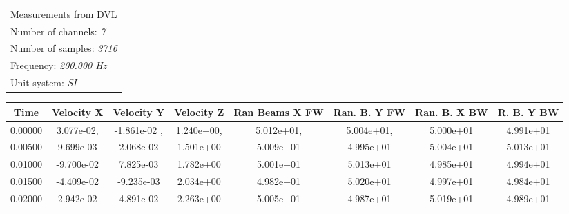 \documentclass[]{article}
\begin{document}
	\begin{table}[H]
		\begin{flushleft}
			\begin{tabular}{l}
				\toprule 
				\footnotesize Measurements from DVL \\
				\footnotesize Number of channels: \textit{7} \\
				\footnotesize Number of samples: \textit{3716} \\
				\footnotesize Frequency: \textit{200.000 Hz} \\
				\footnotesize Unit system: \textit{SI} \\
			\end{tabular}
			
		\end{flushleft}
		\begin{center}
			\begin{tabular}{cccccccc}
				\toprule
				\footnotesize Time & \footnotesize Velocity X &	\footnotesize Velocity Y &	\footnotesize Velocity Z &	\footnotesize Ran Beams X FW &	 \footnotesize Ran. B. Y FW &	\footnotesize Ran. B. X  BW  &	\footnotesize R. B. Y  BW \\
				\midrule
				\footnotesize 0.00000	& \footnotesize 3.077e-02, &	\footnotesize -1.861e-02 ,&	\footnotesize 1.240e+00,&	\footnotesize 5.012e+01,& \footnotesize 5.004e+01, &	\footnotesize 5.000e+01	& \footnotesize 4.991e+01 \\
				
				\footnotesize 0.00500 & \footnotesize 9.699e-03 & \footnotesize 2.068e-02& \footnotesize 1.501e+00 & \footnotesize 5.009e+01 & \footnotesize 4.995e+01 & \footnotesize 5.004e+01 & \footnotesize 5.013e+01 \\
				
				\footnotesize 0.01000 & \footnotesize -9.700e-02 & \footnotesize 7.825e-03 & \footnotesize 1.782e+00 & \footnotesize 5.001e+01 & \footnotesize 5.013e+01 & \footnotesize 4.985e+01 & \footnotesize 4.994e+01 \\
				
				\footnotesize 0.01500 & \footnotesize -4.409e-02 & \footnotesize -9.235e-03 & \footnotesize 2.034e+00 & \footnotesize 4.982e+01 & \footnotesize 5.020e+01 & \footnotesize 4.997e+01 & \footnotesize 4.984e+01 \\
				
				\footnotesize 0.02000 & \footnotesize 2.942e-02 & \footnotesize 4.891e-02 & \footnotesize 2.263e+00 & \footnotesize 5.005e+01 & \footnotesize 4.987e+01 & \footnotesize 5.019e+01 & \footnotesize 4.989e+01 \\
				

\end{tabular}
\end{center}
\end{table}
\end{document}
